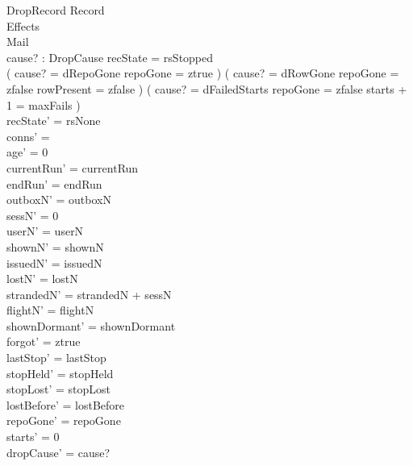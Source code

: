 \documentclass[a4paper,10pt,fleqn]{article}
\begin{document}
\begin{schema}{DropRecord}
  \Delta Record \\
  \Xi Effects \\
  \Delta Mail \\
  cause? : DropCause
  \where
  recState = rsStopped \\
  ( cause? = dRepoGone \land repoGone = ztrue ) \lor
    ( cause? = dRowGone \land repoGone = zfalse \land rowPresent = zfalse ) \lor
    ( cause? = dFailedStarts \land repoGone = zfalse \land starts + 1 = maxFails ) \\
  recState' = rsNone \\
  conns' = \emptyset \\
  age' = 0 \\
  currentRun' = currentRun \\
  endRun' = endRun \\
  outboxN' = outboxN \\
  sessN' = 0 \\
  userN' = userN \\
  shownN' = shownN \\
  issuedN' = issuedN \\
  lostN' = lostN \\
  strandedN' = strandedN + sessN \\
  flightN' = flightN \\
  shownDormant' = shownDormant \\
  forgot' = ztrue \\
  lastStop' = lastStop \\
  stopHeld' = stopHeld \\
  stopLost' = stopLost \\
  lostBefore' = lostBefore \\
  repoGone' = repoGone \\
  starts' = 0 \\
  dropCause' = cause?
\end{schema}
\end{document}
